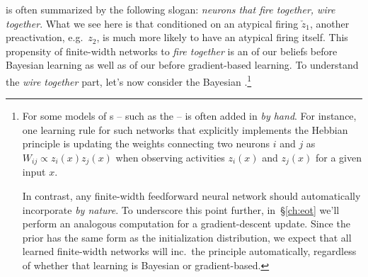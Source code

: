  is often summarized by the following slogan: \emph{neurons that fire together, wire together}. What we see here is that conditioned on an atypical firing $\check{z}_1$, another preactivation, e.g.~$z_2$, is much more likely to have an atypical firing itself. This propensity of finite-width networks to \emph{fire together} is an  of our  beliefs before Bayesian learning as well as of our  before gradient-based learning.
To understand the \emph{wire together} part, let's now consider the Bayesian .\footnote{
For some models of s -- such as the  --  is often added in \emph{by hand}. For instance,  one learning rule for such networks that explicitly implements the Hebbian principle is updating the weights connecting two neurons $i$ and $j$ as $W_{ij} \propto z_i(x) z_j(x)$ when observing activities $z_i(x)$ and $z_j(x)$ for a given input $x$. 

In contrast, any finite-width feedforward neural network 
should automatically incorporate  \emph{by nature}.
To underscore this point further, in~\S\ref{ch:eot} we'll perform an analogous computation for a gradient-descent update. Since the prior has the same form as the initialization distribution, we expect that all learned finite-width networks will 
inc.~the  principle automatically, regardless of whether that learning is Bayesian or gradient-based.}











